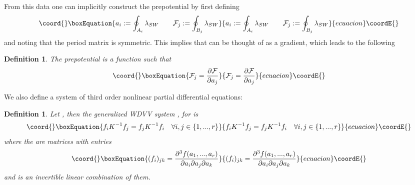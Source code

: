 \documentclass[a4paper,11pt]{article}
\newtheorem{definition}[theorem]{Definition}
\numberwithin{equation}{section}
\begin{document}
\bigskip

\bigskip

\noindent From this data one can implicitly construct the prepotential by
first defining 
\begin{equation}\coord{}\boxEquation{
a_{i}:=\oint_{A_{i}}\lambda _{SW}\qquad \mathcal{F}_{j}:=\oint_{B_{j}}
\lambda _{SW}
}{
a_{i}:=\oint_{A_{i}}\lambda _{SW}\qquad \mathcal{F}_{j}:=\oint_{B_{j}}
\lambda _{SW}
}{ecuacion}\coordE{}\end{equation}
and noting that the period matrix \coordHE{} is symmetric. This implies that \coordHE{} can be thought of
as a gradient, which leads to the following

\begin{definition}
The prepotential is a function \coordHE{} such that 
\begin{equation}\coord{}\boxEquation{
\mathcal{F}_{j}=\dfrac{\partial \mathcal{F}}{\partial a_{j}}
}{
\mathcal{F}_{j}=\dfrac{\partial \mathcal{F}}{\partial a_{j}}
}{ecuacion}\coordE{}\end{equation}
\end{definition}

\noindent We also define a system of third order nonlinear partial
differential equations:

\begin{definition}
Let \coordHE{}, then the generalized WDVV
system \cite{BONE-MATO:1996}, \cite{MARS-MIRO-MORO:1996} for \coordHE{} is 
\begin{equation}\coord{}\boxEquation{
f_{i}K^{-1}f_{j}=f_{j}K^{-1}f_{i}\quad \forall i,j\in \left\{
1,...,r\right\} 
}{
f_{i}K^{-1}f_{j}=f_{j}K^{-1}f_{i}\quad \forall i,j\in \left\{
1,...,r\right\} 
}{ecuacion}\coordE{}\end{equation}
where the \coordHE{} are matrices with entries 
\begin{equation}\coord{}\boxEquation{
(f_{i})_{jk}=\dfrac{\partial ^{3}f(a_{1},...,a_{r})}{\partial a_{i}\partial
a_{j}\partial a_{k}}
}{
(f_{i})_{jk}=\dfrac{\partial ^{3}f(a_{1},...,a_{r})}{\partial a_{i}\partial
a_{j}\partial a_{k}}
}{ecuacion}\coordE{}\end{equation}
and \coordHE{} is an invertible linear combination
of them.
\end{definition}
\end{document}
